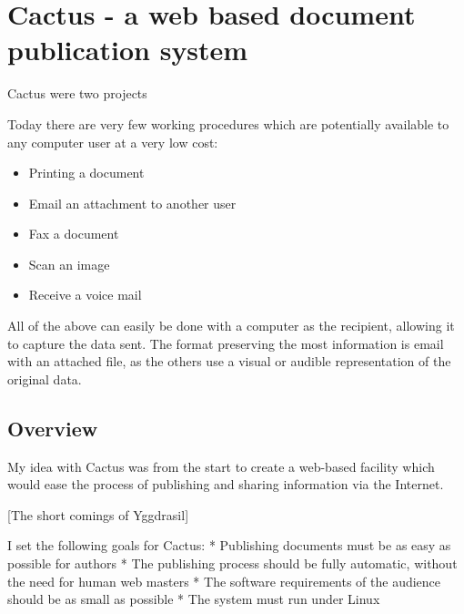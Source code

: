 



\chapter{Cactus - a web based document publication system}
\label{sec:cactus}

Cactus were two projects

Today there are very few working procedures which are potentially
available to any computer user at a very low cost:

\begin{itemize}
\item Printing a document
\item Email an attachment to another user
\item Fax a document
\item Scan an image
\item Receive a voice mail
\end{itemize}

All of the above can easily be done with a computer as the recipient,
allowing it to capture the data sent.  The format preserving the most
information is email with an attached file, as the others use a visual
or audible representation of the original data.

\section{Overview}

   My idea with Cactus was from the start to create a web-based facility
   which would ease the process of publishing and sharing information via
   the Internet.

   [The short comings of Yggdrasil]

   I set the following goals for Cactus:
     * Publishing documents must be as easy as possible for authors
     * The publishing process should be fully automatic, without the need
       for human web masters
     * The software requirements of the audience should be as small as
       possible
     * The system must run under Linux

